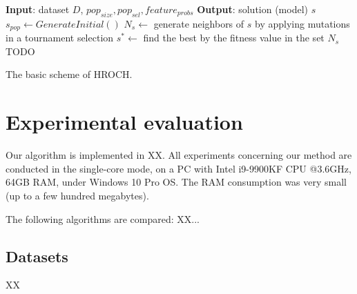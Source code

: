 \documentclass{bmcart}
\begin{document}
\begin{algorithm}
	\begin{algorithmic}[1]
		\Statex \textbf{Input}: dataset $D$, $pop_{size}, pop_{sel}, feature_{probs}$ 
		\Statex \textbf{Output}: solution (model) $s$
		\State $s_{pop} \gets GenerateInitial()$
                  \State $N_s \gets$ generate neighbors of $s$ by applying mutations in a tournament selection
                  \State $s^* \gets$ find the best by the fitness value in the set $N_s$
                  \State TODO
             \EndFor
        \EndWhile
	\end{algorithmic}
    \caption{The basic scheme of HROCH.}
\end{algorithm}


 
 
 

 
\section{Experimental evaluation}\label{sec:experiments}

Our  algorithm is implemented in XX. All experiments concerning our method are conducted in the single-core mode, on a PC with Intel i9-9900KF CPU @3.6GHz, 64GB RAM, under Windows 10 Pro OS. The RAM consumption was very small (up to a few hundred megabytes).   

The following algorithms  are compared: XX...


\subsection{Datasets}
 XX
 
\end{document}

